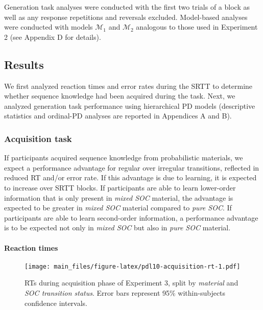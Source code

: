 \documentclass[man]{apa6}
\theoremstyle{definition}
\theoremstyle{definition}
\theoremstyle{definition}
\theoremstyle{remark}
\begin{document}
Generation task analyses were conducted with the first two trials of a
block as well as any response repetitions and reversals excluded.
Model-based analyses were conducted with models \(\mathcal{M}_1\) and
\(\mathcal{M}_2\) analogous to those used in Experiment 2 (see Appendix
D for details).

\subsection{Results}\label{results-2}

We first analyzed reaction times and error rates during the SRTT to
determine whether sequence knowledge had been acquired during the task.
Next, we analyzed generation task performance using hierarchical PD
models (descriptive statistics and ordinal-PD analyses are reported in
Appendices A and B).

\subsubsection{Acquisition task}\label{acquisition-task-2}

If participants acquired sequence knowledge from probabilistic
materials, we expect a performance advantage for regular over irregular
transitions, reflected in reduced RT and/or error rate. If this
advantage is due to learning, it is expected to increase over SRTT
blocks. If participants are able to learn lower-order information that
is only present in \emph{mixed SOC} material, the advantage is expected
to be greater in \emph{mixed SOC} material compared to \emph{pure SOC}.
If participants are able to learn second-order information, a
performance advantage is to be expected not only in \emph{mixed SOC} but
also in \emph{pure SOC} material.

\paragraph{Reaction times}\label{reaction-times-2}

\begin{figure}
\centering
\texttt{[image: main\_files/figure-latex/pdl10-acquisition-rt-1.pdf]}
\caption{\label{fig:pdl10-acquisition-rt}RTs during acquisition phase of
Experiment 3, split by \emph{material} and \emph{SOC transition status}.
Error bars represent 95\% within-subjects confidence intervals.}
\end{figure}
\end{document}

